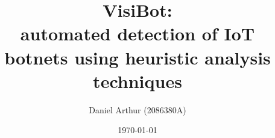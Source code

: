 \documentclass{l4proj}
\begin{document}
\title{VisiBot:\\automated detection of IoT botnets using heuristic analysis techniques}
\author{Daniel Arthur (2086380A)}
\date{\today}

\maketitle



\def\consentname {Daniel Arthur}
\def\consentdate {\today}
\educationalconsent



\tableofcontents










% 


\end{document}
